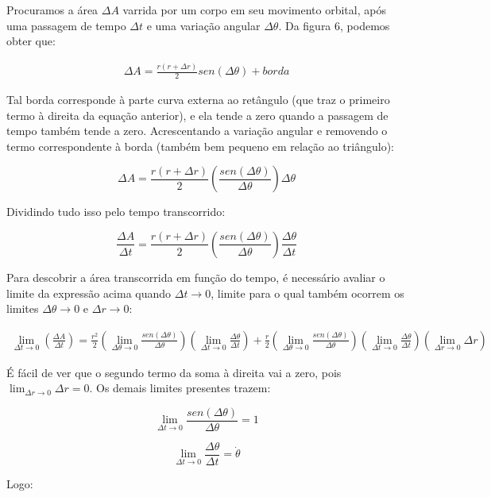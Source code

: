 Procuramos a área $\Delta A$ varrida por um corpo em seu movimento orbital, após uma passagem de tempo $\Delta t$ e uma variação angular $\Delta \theta$. Da figura 6, podemos obter que:

\begin{eqnarray}
	\Delta A = \frac{r(r+\Delta r)}{2}sen(\Delta \theta) + borda\label{eq53}
\end{eqnarray}

Tal borda corresponde à parte curva externa ao retângulo (que traz o primeiro termo à direita da equação anterior), e ela tende a zero quando a passagem de tempo também tende a zero. Acrescentando a variação angular e removendo o termo correspondente à borda (também bem pequeno em relação ao triângulo):

\[
	\Delta A = \frac{r(r+\Delta r)}{2}\left(\frac{sen(\Delta \theta)}{\Delta \theta}\right)\Delta \theta
\]

Dividindo tudo isso pelo tempo transcorrido:

\[
    \frac{\Delta A}{\Delta t} = \frac{r(r+\Delta r)}{2}\left(\frac{sen(\Delta \theta)}{\Delta \theta}\right)\frac{\Delta \theta}{\Delta t}
\]

Para descobrir a área transcorrida em função do tempo, é necessário avaliar o limite da expressão acima quando $\Delta t \rightarrow 0$, limite para o qual também ocorrem os limites $\Delta \theta \rightarrow 0$ e $\Delta r \rightarrow 0$:

\begin{eqnarray}
	 \lim_{\Delta t \rightarrow 0}\left({\frac{\Delta A}{\Delta t}}\right) = \frac{r^2}{2}\left(\lim_{\Delta \theta \rightarrow 0}{\frac{sen(\Delta \theta)}{\Delta \theta}}\right)\left(\lim_{\Delta t \rightarrow 0}{\frac{\Delta \theta}{\Delta t}}\right) + \frac{r}{2}\left(\lim_{\Delta \theta \rightarrow 0}{\frac{sen(\Delta \theta)}{\Delta \theta}}\right)\left(\lim_{\Delta t \rightarrow 0}{\frac{\Delta \theta}{\Delta t}}\right)\left(\lim_{\Delta r \rightarrow 0}{\Delta r}\right) \label{eq54}
\end{eqnarray}

É fácil de ver que o segundo termo da soma à direita vai a zero, pois $\lim_{\Delta r \rightarrow 0}{\Delta r} = 0$. Os demais limites presentes trazem:

\[
	\lim_{\Delta t \rightarrow 0}{\frac{sen(\Delta \theta)}{\Delta \theta}} = 1
\]

\[
	\lim_{\Delta t \rightarrow 0}{\frac{\Delta \theta}{\Delta t}} = \dot{\theta}
\]

Logo:

